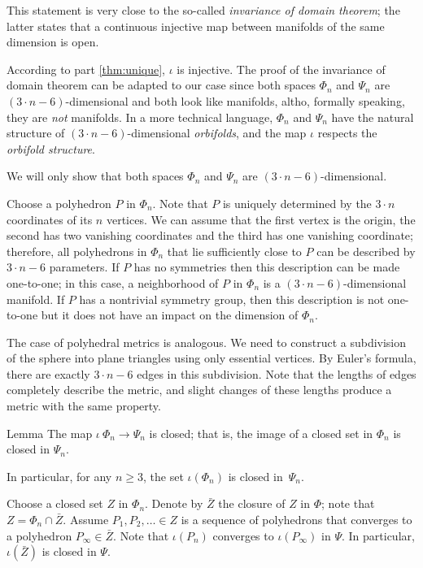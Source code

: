 This statement is very close to the so-called \emph{invariance of domain theorem};
the latter states that a continuous injective map between manifolds of the same dimension is open.

According to part \ref{thm:unique}, $\iota$ is injective.
The proof of the invariance of domain theorem can be adapted to our case since both spaces $\Phi_n$ and $\Psi_n$ are $(3\cdot n-6)$-dimensional and both look like manifolds, altho, formally speaking, they are \emph{not} manifolds.
In a more technical language, $\Phi_n$ and $\Psi_n$ have the natural structure of $(3\cdot n-6)$-dimensional \emph{orbifolds},
and the map $\iota$ respects the \emph{orbifold structure}.

We will only show that both spaces $\Phi_n$ and $\Psi_n$ are $(3\cdot n-6)$-dimensional.

Choose a polyhedron $P$ in $\Phi_n$.
Note that $P$ is uniquely determined by the $3\cdot n$ coordinates of its $n$ vertices.
We can assume that the first vertex is the origin, the second has two vanishing coordinates and the third has one vanishing coordinate; therefore, all polyhedrons in $\Phi_n$ that lie sufficiently close to $P$ can be described by $3\cdot n-6$ parameters.
If $P$ has no symmetries then this description can be made one-to-one;
in this case, a neighborhood of $P$ in $\Phi_n$ is a $(3\cdot n-6)$-dimensional manifold.
If $P$ has a nontrivial symmetry group, then this description is not one-to-one but it does not have an impact on the dimension of $\Phi_n$.

The case of polyhedral metrics is analogous.
We need to construct a subdivision of the sphere into plane triangles using only essential vertices.
By Euler's formula, there are exactly $3\cdot n-6$ edges in this subdivision.
Note that the lengths of edges completely describe the metric, and slight changes of these lengths produce a metric with the same property.

\begin{thm}{Lemma}
The map $\iota\:\Phi_n\to\Psi_n$ is closed;
that is, the image of a closed set in $\Phi_n$ is closed in $\Psi_n$.

In particular, for any $n\ge 3$, the set $\iota(\Phi_n)$ is closed in~$\Psi_n$.
\end{thm}

Choose a closed set $Z$ in $\Phi_n$.
Denote by $\bar Z$ the closure of $Z$ in $\Phi$; note that $Z=\Phi_n\cap \bar Z$.
Assume $P_1,P_2,\dots\in Z$ is a sequence of polyhedrons that converges to a polyhedron $P_\infty\in\bar Z$.
Note that $\iota(P_n)$ converges to $\iota(P_\infty)$ in $\Psi$.
In particular, $\iota(\bar Z)$ is closed in $\Psi$.

